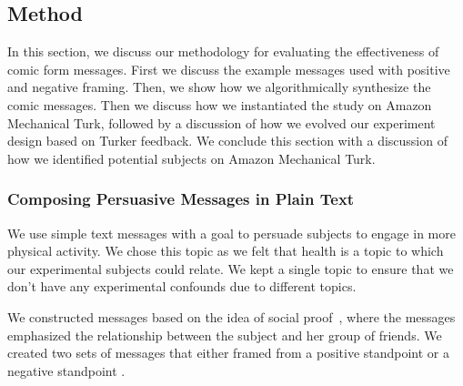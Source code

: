 \subsection{Method}
\label{sec:Method}

In this section, we discuss our methodology for evaluating the effectiveness of comic form messages. First we discuss the example messages used with positive and negative framing. Then, we show how we algorithmically synthesize the comic messages. Then we discuss how we instantiated the study on Amazon Mechanical Turk, followed by a discussion of how we evolved our experiment design based on Turker feedback. We conclude this section with a discussion of how we identified potential subjects on Amazon Mechanical Turk.

\subsubsection{Composing Persuasive Messages in Plain Text}
We use simple text messages with a goal to persuade subjects to engage in more physical activity. We chose this topic as we felt that health is a topic to which our experimental subjects could relate. We kept a single topic to ensure that we don't have any experimental confounds due to different topics.


We constructed messages based on the idea of social proof~\cite{goldstein2008room}, where the messages emphasized the relationship between the subject and her group of friends. We created two sets of messages that either framed from a positive standpoint or a negative standpoint \cite{tversky1981framing}.

